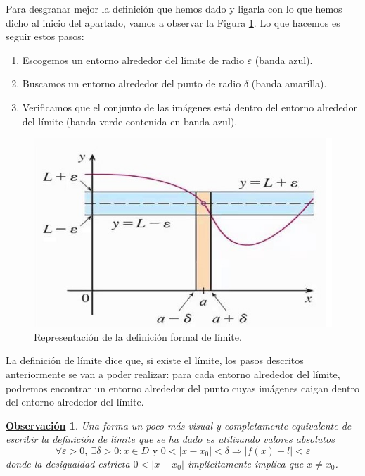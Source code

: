 \documentclass[10pt,a4paper,openright]{book}
\theoremstyle{break}
\newtheorem{obs}{\underline{Observación}}[chapter]
\begin{document}
Para desgranar mejor la definición que hemos dado y ligarla con lo que hemos dicho al inicio del apartado, vamos a observar la Figura \ref{fig:definicion_formal_limite}. Lo que hacemos es seguir estos pasos:
\begin{enumerate}
\item Escogemos un entorno alrededor del límite de radio $\varepsilon$ (banda azul).
\item Buscamos un entorno alrededor del punto de radio $\delta$ (banda amarilla).
\item Verificamos que el conjunto de las imágenes está dentro del entorno alrededor del límite (banda verde contenida en banda azul).
\end{enumerate}

\begin{figure}[h]
\centering
\includegraphics[scale=0.40]{limite}
\caption{Representación de la definición formal de límite.}
\label{fig:definicion_formal_limite}
\end{figure}

La definición de límite dice que, si existe el límite, los pasos descritos anteriormente se van a poder realizar: para cada entorno alrededor del límite, podremos encontrar un entorno alrededor del punto cuyas imágenes caigan dentro del entorno alrededor del límite.

\begin{obs}
Una forma un poco más visual y completamente equivalente de escribir la definición de límite que se ha dado es utilizando valores absolutos
\[
\forall \varepsilon>0, \ \exists \delta>0 : x\in D \mbox{ y } 0 < |x-x_0| < \delta\Rightarrow |f(x)-l|<\varepsilon
\]
donde la desigualdad estricta $0 < |x-x_0|$ implícitamente implica que $x \neq x_0$.
\end{obs}
\end{document}
